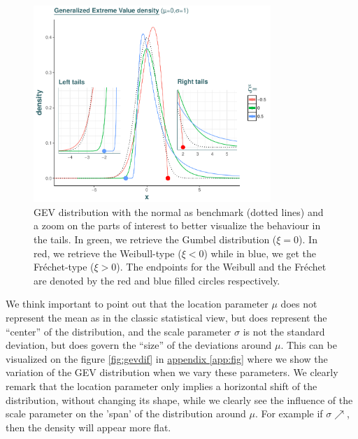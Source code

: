 \documentclass[11pt,a4paper,openany ]{book}
\begin{document}
\begin{figure}[!htb]
	\centering\includegraphics[width=0.8\textwidth, height = 0.7\linewidth]{gev3.pdf}\caption{GEV distribution with the normal as benchmark (dotted lines) and a zoom on the parts of interest to better visualize the behaviour in the tails. In green, we retrieve the Gumbel distribution ($\xi=0$). In red, we retrieve the Weibull-type ($\xi<0$) while in blue, we get the Fréchet-type ($\xi>0$). The endpoints for the Weibull and the Fréchet are denoted by the red and blue filled circles respectively. }\label{gevdens}
\end{figure}

 We think important to point out that the location parameter $\mu$ does not represent
the mean as in the classic statistical view, but does represent the “center” of the distribution, and the scale parameter
$\sigma$ is not the standard deviation, but does govern the “size” of the deviations around $\mu$. This can be visualized on the figure \ref{fig:gevdif} in \hyperref[app:fig]{appendix \ref{app:fig}} where we show the variation of the GEV distribution when we vary these parameters. We clearly remark that the location parameter only implies a horizontal shift of the distribution, without changing its shape, while we clearly see the influence of the scale parameter on the 'span' of the distribution around $\mu$. For example if $\sigma \nearrow$, then the density will appear more flat.  
\end{document}
